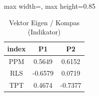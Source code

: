 \begin{table}[H]
\centering
\caption{Vektor Eigen / Kompas (Indikator)} \label{tab:samplev_s}
\begin{adjustbox}{max width=\textwidth, max height=0.85\textheight}
\begin{tabular}{|c|c|c|}
\hline
\textbf{index} & \textbf{P1} & \textbf{P2} \\
\hline
PPM & 0.5649 & 0.6152 \\
RLS & -0.6579 & 0.0719 \\
TPT & 0.4674 & -0.7377 \\
\hline
\end{tabular}
\end{adjustbox}
\end{table}